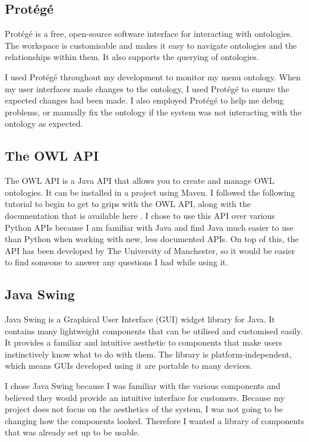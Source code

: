 \subsection{Protégé}

Protégé \cite{protege_2023} is a free, open-source software interface for interacting with ontologies. The workspace is customisable and makes it easy to navigate ontologies and the relationships within them. It also supports the querying of ontologies.

I used Protégé throughout my development to monitor my menu ontology. When my user interfaces made changes to the ontology, I used Protégé to ensure the expected changes had been made. I also employed Protégé to help me debug problems, or manually fix the ontology if the system was not interacting with the ontology as expected.

\subsection{The OWL API}

The OWL API is a Java API that allows you to create and manage OWL ontologies. It can be installed in a project using Maven. I followed the following tutorial \cite{matenzoglu_palmisano_2016} to begin to get to grips with the OWL API, along with the documentation that is available here \cite{owl_api_doc_2023}. I chose to use this API over various Python APIs because I am familiar with Java and find Java much easier to use than Python when working with new, less documented APIs. On top of this, the API has been developed by The University of Manchester, so it would be easier to find someone to answer any questions I had while using it.

\subsection{Java Swing}

Java Swing \cite{java_swing_2020} is a Graphical User Interface (GUI) widget library for Java. It contains many lightweight components that can be utilised and customised easily. It provides a familiar and intuitive aesthetic to components that make users instinctively know what to do with them. The library is platform-independent, which means GUIs developed using it are portable to many devices.

I chose Java Swing because I was familiar with the various components and believed they would provide an intuitive interface for customers. Because my project does not focus on the aesthetics of the system, I was not going to be changing how the components looked. Therefore I wanted a library of components that was already set up to be usable. 

